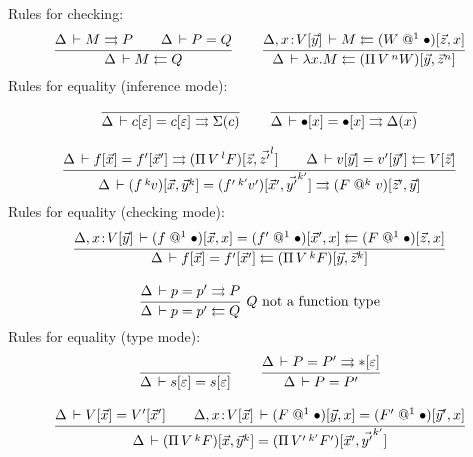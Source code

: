 \documentclass[a4paper]{article}
\makeatletter
\newcommand{\oann}[1]{{}^{#1}\kern-0.15ex}
\newcommand{\ovar}{\mathord{\bullet}}
\newcommand{\oapp}[1]{\,\oann{#1}}
\newcommand{\olam}[1]{\lambda^{#1}.\,}
\newcommand{\opi}[2]{\Pi\,#1\,^{#2}}
\renewcommand{\sempty}{\varepsilon}
\newcommand{\oclos}[2]{#1[#2]}
\newcommand{\oclosp}[2]{(#1)[#2]}
\newcommand{\ochk}[4]{#1 \der #2 \jchk \oclos{#4}{#3}}
\newcommand{\oinf}[4]{#1 \der #2 \jinf \oclos{#4}{#3}}
\newcommand{\vapp}[1]{\mathrel{@^{#1}}}
\makeatother
\begin{document}
Rules for checking:
\begin{gather*}
  \ru{\Delta \der M \jinf P \qquad
      \Delta \der P = Q
    }{\Delta \der M \jchk Q}
\qquad
  \ru{\ochk {\Delta, x \of \oclos V {\vec y}} M {\vec z,x} {(W \vapp 1 \ovar)}
    }{\ochk \Delta {\lambda x.M} {\vec y,{\vec z}^n} {(\opi V n W)}}
\end{gather*}
Rules for equality (inference mode):
\begin{gather*}
  \ru{}{\Delta \der \oclos c \sempty = \oclos c \sempty \jinf \Sigma(c)} 
\qquad
  \ru{}{\Delta \der \oclos \ovar x = \oclos \ovar x \jinf \Delta(x)}
\\[2ex]
  \ru{\Delta \der \oclos f {\vec x} = \oclos {f'}{\vec x'} \jinf 
        \oclosp{\opi V l F}{\vec z,{\vec {z'}}^l} \qquad
      \Delta \der \oclos v {\vec y} = \oclos {v'}{\vec y'} \jchk
        \oclos V {\vec z}
    }{\Delta \der \oclosp {f \oapp k v}{\vec x,\vec y^k} 
                = \oclosp {f' \oapp {k'} v'}{\vec x',{\vec {y'}}^{k'}}
                \jinf \oclosp{F \vapp{k} v}{\vec z',\vec y}
    } 
\end{gather*}
Rules for equality (checking mode):
\begin{gather*}
  \ru{\Delta, x \of \oclos V {\vec y} \der 
        \oclosp {f  \vapp 1 \ovar}{\vec x ,x} = 
        \oclosp {f' \vapp 1 \ovar}{\vec x',x}  \jchk 
        \oclosp {F  \vapp 1 \ovar}{\vec z, x} 
    }{\Delta \der \oclos f {\vec x} = \oclos {f'} {\vec x'}
          \jchk \oclosp {\opi V k F}{\vec y,\vec z^k}} 
\\[2ex]
  \rux{\Delta \der p = p' \jinf P
     }{\Delta \der p = p' \jchk Q
     }{Q \mbox{ not a function type}} 
\end{gather*}
Rules for equality (type mode):
\begin{gather*}
  \ru{}{\Delta \der \oclos s \sempty = \oclos s \sempty} 
\qquad
  \ru{\Delta \der P = P' \jinf \oclos \ttype \sempty
    }{\Delta \der P = P'}
\\[2ex]
  \ru{\Delta \der \oclos V {\vec x} = \oclos {V'}{\vec x'} \qquad
      \Delta, x\of\oclos V {\vec x} \der 
         \oclosp{F  \vapp 1 \ovar}{\vec y,x} =
         \oclosp{F' \vapp 1 \ovar}{\vec y',x} 
    }{\Delta \der \oclosp {\opi {V }{k }{F }}{\vec x ,\vec y^k}
               =  \oclosp {\opi {V'}{k'}{F'}}{\vec x',\vec {y'}^{k'}}
    }
\end{gather*}
\end{document}
